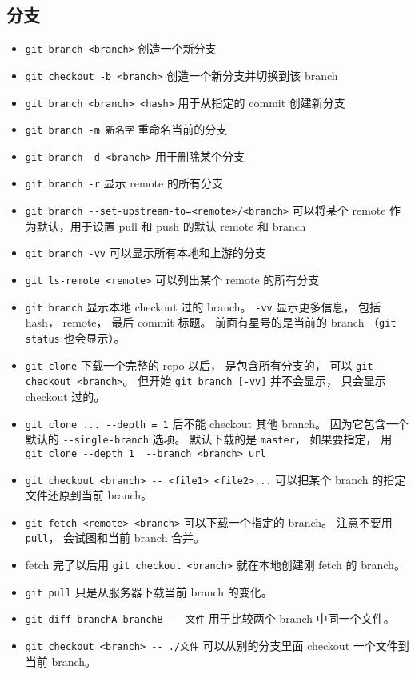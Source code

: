\subsection{分支}
\begin{itemize}
\item \verb`git branch <branch>` 创造一个新分支
\item \verb`git checkout -b <branch>` 创造一个新分支并切换到该 branch
\item \verb`git branch <branch> <hash>` 用于从指定的 commit 创建新分支
\item \verb`git branch -m 新名字` 重命名当前的分支
\item \verb`git branch -d <branch>` 用于删除某个分支
\item \verb`git branch -r` 显示 remote 的所有分支
\item \verb`git branch --set-upstream-to=<remote>/<branch>` 可以将某个 remote 作为默认，用于设置 pull 和 push 的默认 remote 和 branch
\item \verb`git branch -vv` 可以显示所有本地和上游的分支
\item \verb`git ls-remote <remote>` 可以列出某个 remote 的所有分支
\item \verb`git branch` 显示本地 checkout 过的 branch。 \verb`-vv` 显示更多信息， 包括 hash， remote， 最后 commit 标题。 前面有星号的是当前的 branch （\verb`git status` 也会显示）。
\item \verb`git clone` 下载一个完整的 repo 以后， 是包含所有分支的， 可以 \verb`git checkout <branch>`。 但开始 \verb`git branch [-vv]` 并不会显示， 只会显示 checkout 过的。
\item \verb`git clone ... --depth = 1` 后不能 checkout 其他 branch。 因为它包含一个默认的 \verb`--single-branch` 选项。 默认下载的是 \verb`master`， 如果要指定， 用 \verb`git clone --depth 1  --branch <branch> url`
\item \verb`git checkout <branch> -- <file1> <file2>...` 可以把某个 branch 的指定文件还原到当前 branch。
\item \verb`git fetch <remote> <branch>` 可以下载一个指定的 branch。 注意不要用 \verb`pull`， 会试图和当前 branch 合并。
\item fetch 完了以后用 \verb`git checkout <branch>` 就在本地创建刚 fetch 的 branch。
\item \verb`git pull` 只是从服务器下载当前 branch 的变化。
\item \verb`git diff branchA branchB -- 文件` 用于比较两个 branch 中同一个文件。
\item \verb`git checkout <branch> -- ./文件` 可以从别的分支里面 checkout 一个文件到当前 branch。


\end{itemize}
